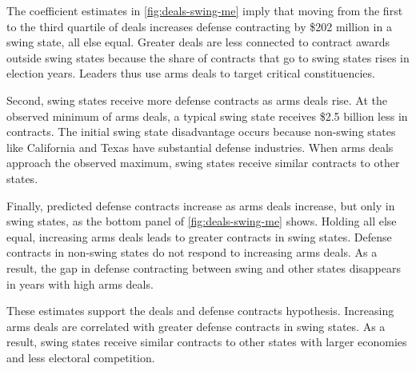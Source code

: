 \documentclass[12pt]{article}
\begin{document}
The coefficient estimates in \autoref{fig:deals-swing-me} imply that moving from the first to the third quartile of deals increases defense contracting by \$202 million in a swing state, all else equal. 
Greater deals are less connected to contract awards outside swing states because the share of contracts that go to swing states rises in election years. 
Leaders thus use arms deals to target critical constituencies.


Second, swing states receive more defense contracts as arms deals rise. 
At the observed minimum of arms deals, a typical swing state receives \$2.5 billion less in contracts.
The initial swing state disadvantage occurs because non-swing states like California and Texas have substantial defense industries.
When arms deals approach the observed maximum, swing states receive similar contracts to other states. 


Finally, predicted defense contracts increase as arms deals increase, but only in swing states, as the bottom panel of \autoref{fig:deals-swing-me} shows. 
Holding all else equal, increasing arms deals leads to greater contracts in swing states. 
Defense contracts in non-swing states do not respond to increasing arms deals.
As a result, the gap in defense contracting between swing and other states disappears in years with high arms deals. 



These estimates support the deals and defense contracts hypothesis. 
Increasing arms deals are correlated with greater defense contracts in swing states. 
As a result, swing states receive similar contracts to other states with larger economies and less electoral competition. 



%
%
%
%
\end{document}
